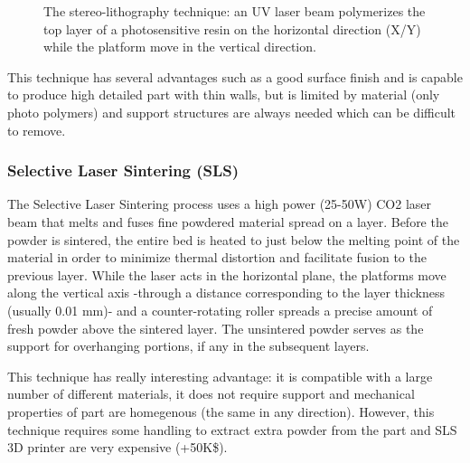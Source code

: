 \begin{figure}[h]
    \centering
        \hfil
        \hfil
    \caption{The stereo-lithography technique: an UV laser beam polymerizes the top layer of a photosensitive resin on the horizontal direction (X/Y) while the platform move in the vertical direction.}
    \label{fig:SLA_technique}
\end{figure}

This technique has several advantages such as a good surface finish and is capable to produce high detailed part with thin walls, but is limited by material (only photo polymers) and support structures are always needed which can be difficult to remove.

\subsubsection{Selective Laser Sintering (SLS)} %
The Selective Laser Sintering process uses a high power (25-50W) CO2 laser beam that melts and fuses fine powdered material spread on a layer. Before the powder is sintered, the entire bed is heated to just below the melting point of the material in order to minimize thermal distortion and facilitate fusion to the previous layer.
While the laser acts in the horizontal plane, the platforms move along the vertical axis -through a distance corresponding to the layer thickness (usually 0.01 mm)- and a counter-rotating roller spreads a precise amount of fresh powder above the sintered layer. The unsintered powder serves as the support for overhanging portions, if any in the subsequent layers.

\begin{figure}[h]
    \centering
        \hfil
        \hfil
    \caption{}
    \label{fig:SLS_technique}
\end{figure}

This technique has really interesting advantage: it is compatible with a large number of different materials, it does not require support and mechanical properties of part are homegenous (the same in any direction). However, this technique requires some handling to extract extra powder from the part and SLS 3D printer are very expensive (+50K\$).


